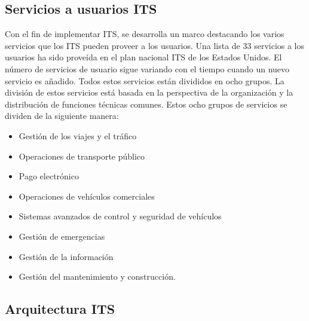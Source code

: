 \subsection{Servicios a usuarios ITS}

Con el fin de implementar ITS, se desarrolla un marco destacando los varios servicios que los ITS pueden proveer a los usuarios. Una lista de 33 servicios a los usuarios ha sido proveída en el plan nacional ITS de los Estados Unidos. El número de servicios de usuario sigue variando con el tiempo cuando un nuevo servicio es añadido. Todos estos servicios están divididos en ocho grupos. La división de estos servicios está basada en la perspectiva de la organización y la distribución de funciones técnicas comunes. Estos ocho grupos de servicios se dividen de la siguiente manera:

\begin{itemize}
\item Gestión de los viajes y el tráfico

\item Operaciones de transporte público

\item Pago electrónico

\item Operaciones de vehículos comerciales

\item Sistemas avanzados de control y seguridad de vehículos

\item Gestión de emergencias

\item Gestión de la información

\item Gestión del mantenimiento y construcción.
\end{itemize}

\subsection{Arquitectura ITS}

